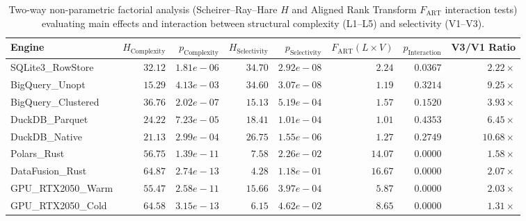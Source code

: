 \begin{table}[htbp]
\centering
\scriptsize
\setlength{\tabcolsep}{4.5pt}
\caption{Two-way non-parametric factorial analysis (Scheirer--Ray--Hare $H$ and Aligned Rank Transform $F_{\text{ART}}$ interaction tests) evaluating main effects and interaction between structural complexity (L1--L5) and selectivity (V1--V3).}
\label{tab:two_way_interaction}
\begin{tabular}{@{}lrrrrrrr@{}}
\toprule
\textbf{Engine} & \textbf{$H_{\text{Complexity}}$} & \textbf{$p_{\text{Complexity}}$} & \textbf{$H_{\text{Selectivity}}$} & \textbf{$p_{\text{Selectivity}}$} & \textbf{$F_{\text{ART}} (L \times V)$} & \textbf{$p_{\text{Interaction}}$} & \textbf{V3/V1 Ratio} \\
\midrule
SQLite3\_RowStore & $32.12$ & $1.81e-06$ & $34.70$ & $2.92e-08$ & $2.24$ & $0.0367$ & $2.22\times$ \\
BigQuery\_Unopt & $15.29$ & $4.13e-03$ & $34.60$ & $3.07e-08$ & $1.19$ & $0.3214$ & $9.25\times$ \\
BigQuery\_Clustered & $36.76$ & $2.02e-07$ & $15.13$ & $5.19e-04$ & $1.57$ & $0.1520$ & $3.93\times$ \\
DuckDB\_Parquet & $24.22$ & $7.23e-05$ & $18.41$ & $1.01e-04$ & $1.01$ & $0.4353$ & $6.45\times$ \\
DuckDB\_Native & $21.13$ & $2.99e-04$ & $26.75$ & $1.55e-06$ & $1.27$ & $0.2749$ & $10.68\times$ \\
Polars\_Rust & $56.75$ & $1.39e-11$ & $7.58$ & $2.26e-02$ & $14.07$ & $0.0000$ & $1.58\times$ \\
DataFusion\_Rust & $64.87$ & $2.74e-13$ & $4.28$ & $1.18e-01$ & $16.67$ & $0.0000$ & $2.07\times$ \\
GPU\_RTX2050\_Warm & $55.47$ & $2.58e-11$ & $15.66$ & $3.97e-04$ & $5.87$ & $0.0000$ & $2.03\times$ \\
GPU\_RTX2050\_Cold & $64.58$ & $3.15e-13$ & $6.15$ & $4.62e-02$ & $8.65$ & $0.0000$ & $1.31\times$ \\
\bottomrule
\end{tabular}
\end{table}
